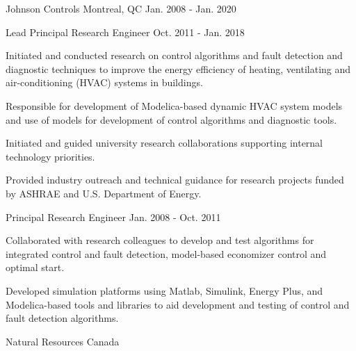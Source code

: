 

\begin{cventries}

\cvmultientry
{Johnson Controls} %
{Montreal, QC}
{Jan. 2008 - Jan. 2020} %
{
\cvsubentry
{Lead Principal Research Engineer} %
{} %
{Oct. 2011 - Jan. 2018} %
{
\begin{cvitems} %
\item {Initiated and conducted research on control algorithms and fault detection and diagnostic techniques to improve the energy efficiency of heating, ventilating and air-conditioning (HVAC) systems in buildings.}
\item {Responsible for development of Modelica-based dynamic HVAC system models and use of models for development of control algorithms and diagnostic tools.}
\item {Initiated and guided university research collaborations supporting internal technology priorities.}
\item {Provided industry outreach and technical guidance for research projects funded by ASHRAE and U.S. Department of Energy.}
\end{cvitems}
}%
\cvsubentry
{Principal Research Engineer} %
{} %
{Jan. 2008 - Oct. 2011} %
{
\begin{cvitems} %
\item {Collaborated with research colleagues to develop and test algorithms for integrated control and fault detection, model-based economizer control and optimal start.}
\item {Developed simulation platforms using Matlab, Simulink, Energy Plus, and Modelica-based tools and libraries to aid development and testing of control and fault detection algorithms.}
\end{cvitems}
}
}
\cventry
{Natural Resources Canada} %

\end{cventries}
